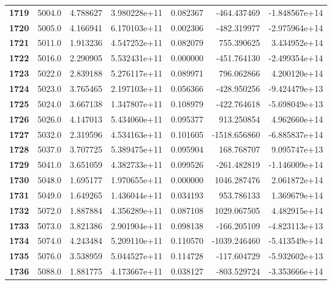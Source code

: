 \documentclass{report}[12pt]
\begin{document}
\begin{center}
\begin{tabular}{lrrrrrr}
\textbf{1719} &         5004.0 &   4.788627 &  3.980228e+11 &    0.082367 &  -464.437469 & -1.848567e+14 \\
\textbf{1720} &         5005.0 &   4.166941 &  6.170103e+11 &    0.002306 &  -482.319977 & -2.975964e+14 \\
\textbf{1721} &         5011.0 &   1.913236 &  4.547252e+11 &    0.082079 &   755.390625 &  3.434952e+14 \\
\textbf{1722} &         5016.0 &   2.290905 &  5.532431e+11 &    0.000000 &  -451.764130 & -2.499354e+14 \\
\textbf{1723} &         5022.0 &   2.839188 &  5.276117e+11 &    0.089971 &   796.062866 &  4.200120e+14 \\
\textbf{1724} &         5023.0 &   3.765465 &  2.197103e+11 &    0.056366 &  -428.950256 & -9.424479e+13 \\
\textbf{1725} &         5024.0 &   3.667138 &  1.347807e+11 &    0.108979 &  -422.764618 & -5.698049e+13 \\
\textbf{1726} &         5026.0 &   4.147013 &  5.434060e+11 &    0.095377 &   913.250854 &  4.962660e+14 \\
\textbf{1727} &         5032.0 &   2.319596 &  4.534163e+11 &    0.101605 & -1518.656860 & -6.885837e+14 \\
\textbf{1728} &         5037.0 &   3.707725 &  5.389475e+11 &    0.095904 &   168.768707 &  9.095747e+13 \\
\textbf{1729} &         5041.0 &   3.651059 &  4.382733e+11 &    0.099526 &  -261.482819 & -1.146009e+14 \\
\textbf{1730} &         5048.0 &   1.695177 &  1.970655e+11 &    0.000000 &  1046.287476 &  2.061872e+14 \\
\textbf{1731} &         5049.0 &   1.649265 &  1.436044e+11 &    0.034193 &   953.786133 &  1.369679e+14 \\
\textbf{1732} &         5072.0 &   1.887884 &  4.356289e+11 &    0.087108 &  1029.067505 &  4.482915e+14 \\
\textbf{1733} &         5073.0 &   3.821386 &  2.901904e+11 &    0.098138 &  -166.205109 & -4.823113e+13 \\
\textbf{1734} &         5074.0 &   4.243484 &  5.209110e+11 &    0.110570 & -1039.246460 & -5.413549e+14 \\
\textbf{1735} &         5076.0 &   3.538959 &  5.044527e+11 &    0.114728 &  -117.604729 & -5.932602e+13 \\
\textbf{1736} &         5088.0 &   1.881775 &  4.173667e+11 &    0.038127 &  -803.529724 & -3.353666e+14 \\

\end{tabular}
\end{center}
\end{document}
